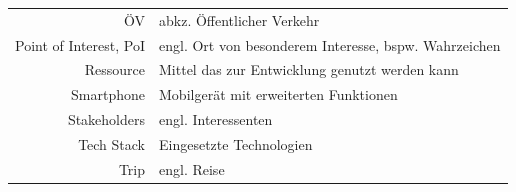 \documentclass[a4paper,10pt,xetex]{article}
\begin{document}
\begin{longtable}[]{@{}rl@{}}
\begin{minipage}[t]{0.18\columnwidth}\raggedleft\strut
ÖV\strut
\end{minipage} & \begin{minipage}[t]{0.76\columnwidth}\raggedright\strut
abkz. Öffentlicher Verkehr\strut
\end{minipage}\tabularnewline
\begin{minipage}[t]{0.18\columnwidth}\raggedleft\strut
Point of Interest, PoI\strut
\end{minipage} & \begin{minipage}[t]{0.76\columnwidth}\raggedright\strut
engl. Ort von besonderem Interesse, bspw. Wahrzeichen\strut
\end{minipage}\tabularnewline
\begin{minipage}[t]{0.18\columnwidth}\raggedleft\strut
Ressource\strut
\end{minipage} & \begin{minipage}[t]{0.76\columnwidth}\raggedright\strut
Mittel das zur Entwicklung genutzt werden kann\strut
\end{minipage}\tabularnewline
\begin{minipage}[t]{0.18\columnwidth}\raggedleft\strut
Smartphone\strut
\end{minipage} & \begin{minipage}[t]{0.76\columnwidth}\raggedright\strut
Mobilgerät mit erweiterten Funktionen\strut
\end{minipage}\tabularnewline
\begin{minipage}[t]{0.18\columnwidth}\raggedleft\strut
Stakeholders\strut
\end{minipage} & \begin{minipage}[t]{0.76\columnwidth}\raggedright\strut
engl. Interessenten\strut
\end{minipage}\tabularnewline
\begin{minipage}[t]{0.18\columnwidth}\raggedleft\strut
Tech Stack\strut
\end{minipage} & \begin{minipage}[t]{0.76\columnwidth}\raggedright\strut
Eingesetzte Technologien\strut
\end{minipage}\tabularnewline
\begin{minipage}[t]{0.18\columnwidth}\raggedleft\strut
Trip\strut
\end{minipage} & \begin{minipage}[t]{0.76\columnwidth}\raggedright\strut
engl. Reise\strut
\end{minipage}\tabularnewline

\end{longtable}
\end{document}
